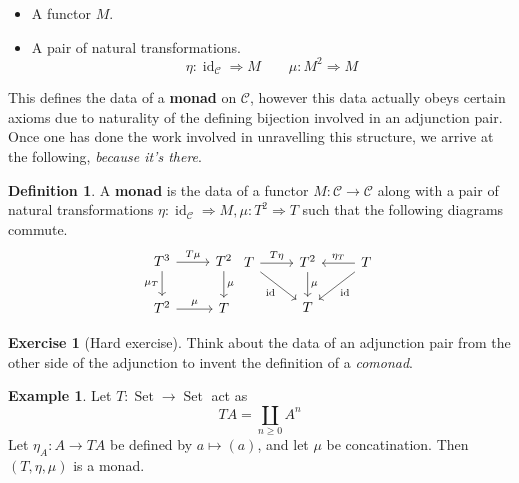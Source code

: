 \documentclass[12pt]{article}
\theoremstyle{plain}
\theoremstyle{definition}
\newtheorem{defn}[thm]{Definition} %
\newtheorem{exercise}[thm]{Exercise}
\newtheorem{example}[thm]{Example}
\newcommand{\scr}[1]{\mathscr{#1}}
\newcommand{\lto}{\longrightarrow}
\begin{document}
\begin{itemize}
	\item A functor $M$.
	\item A pair of natural transformations.
	\begin{equation}
		\eta: \operatorname{id}_{\scr{C}} \Rightarrow M\qquad \mu: M^2 \Rightarrow M
		\end{equation}
	\end{itemize}
This defines the data of a \textbf{monad} on $\scr{C}$, however this data actually obeys certain axioms due to naturality of the defining bijection involved in an adjunction pair. Once one has done the work involved in unravelling this structure, we arrive at the following, \emph{because it's there}.

\begin{defn}
	A \textbf{monad} is the data of a functor $M: \scr{C} \lto \scr{C}$ along with a pair of natural transformations $\eta: \operatorname{id}_\scr{C} \Rightarrow M, \mu: T^2 \Rightarrow T$ such that the following diagrams commute.
	\begin{equation}
		\begin{tikzcd}
			T^3\arrow[r,"{T\mu}"]\arrow[d,swap,"{\mu_T}"] & T^2\arrow[d,"{\mu}"]\\
			T^2\arrow[r,"\mu"] & T
			\end{tikzcd}
		\begin{tikzcd}
			T\arrow[dr,swap,"{\operatorname{id}}"]\arrow[r, "{T\eta}"] & T^2\arrow[d,"{\mu}"] & T\arrow[l,swap,"{\eta_T}"]\arrow[dl,"{\operatorname{id}}"]\\
			& T
			\end{tikzcd}
		\end{equation}
	\end{defn}

\begin{exercise}[Hard exercise]
	Think about the data of an adjunction pair from the other side of the adjunction to invent the definition of a \emph{comonad}.
	\end{exercise}

\begin{example}
	Let $T: \operatorname{Set} \lto \operatorname{Set}$ act as
	\begin{equation}
		TA = \coprod_{n \geq 0}A^n
		\end{equation}
	Let $\eta_A: A \lto TA$ be defined by $a \longmapsto (a)$, and let $\mu$ be concatination. Then $(T, \eta, \mu)$ is a monad.
	\end{example}
\end{document}
